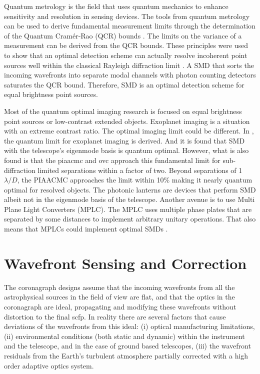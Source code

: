\documentclass[letterpaper]{ar-1col}
\newcommand{\ld}{$\lambda/D$}
\begin{document}
Quantum metrology is the field that uses quantum mechanics to enhance sensitivity and resolution in sensing devices.
%
The tools from quantum metrology can be used to derive fundamental measurement limits through the determination of the Quantum Cram\'er-Rao (QCR) bounds \citep{braunstein1994statistical}.
%
The limits on the variance of a measurement can be derived from the QCR bounds.
%
These principles were used to show that an optimal detection scheme can actually resolve incoherent point sources well within the classical Rayleigh diffraction limit \citep{tsang2016quantum}.
%
A SMD that sorts the incoming wavefronts into separate modal channels with photon counting detectors saturates the QCR bound.
%
Therefore, SMD is an optimal detection scheme for equal brightness point sources.

%
Most of the quantum optimal imaging research is focused on equal brightness point sources or low-contrast extended objects.
%
Exoplanet imaging is a situation with an extreme contrast ratio.
%
The optimal imaging limit could be different.
%
In \citet{deshler2024achieving}, the quantum limit for exoplanet imaging is derived.
%
And it is found that SMD with the telescope's eigenmode basis is quantum optimal. 
%
However, what is also found is that the \ac{piaacmc} and \ac{ovc} approach this fundamental limit for sub-diffraction limited separations within a factor of two.
%
Beyond separations of 1 \ld{}, the PIAACMC approaches the limit within 10\% making it nearly quantum optimal for resolved objects.
%
The photonic lanterns are devices that perform SMD albeit not in the eigenmode basis of the telescope.
%
Another avenue is to use Multi Plane Light Converters (MPLC).
%
The MPLC uses multiple phase plates that are separated by some distances to implement arbitrary unitary operations.
%
That also means that MPLCs could implement optimal SMDs \citep{deshler2024experimental}.

\section{Wavefront Sensing and Correction}

The coronagraph designs assume that the incoming wavefronts from all the astrophysical sources in the field of view are flat, and that the optics in the coronagraph are ideal, propagating and modifying these wavefronts without distortion to the final \ac{scfp}.
%
In reality there are several factors that cause deviations of the wavefronts from this ideal: (i) optical manufacturing limitations, (ii) environmental conditions (both static and dynamic) within the instrument and the telescope, and in the case of ground based telescopes, (iii) the wavefront residuals from the Earth's turbulent atmosphere partially corrected with a high order adaptive optics system.
\end{document}

